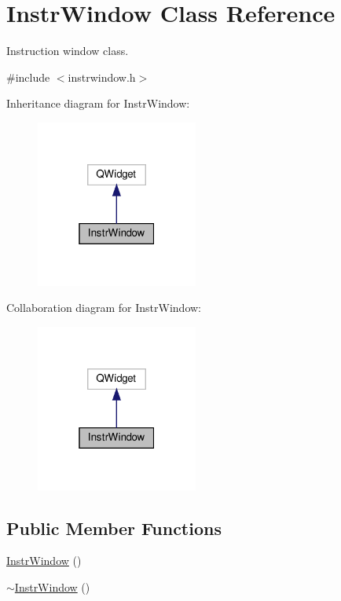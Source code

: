 \hypertarget{classInstrWindow}{}\section{Instr\+Window Class Reference}
\label{classInstrWindow}


Instruction window class.  




{\ttfamily \#include $<$instrwindow.\+h$>$}



Inheritance diagram for Instr\+Window\+:
\nopagebreak
\begin{figure}[H]
\begin{center}
\leavevmode
\includegraphics[width=151pt]{classInstrWindow__inherit__graph}
\end{center}
\end{figure}


Collaboration diagram for Instr\+Window\+:
\nopagebreak
\begin{figure}[H]
\begin{center}
\leavevmode
\includegraphics[width=151pt]{classInstrWindow__coll__graph}
\end{center}
\end{figure}
\subsection*{Public Member Functions}
\begin{DoxyCompactItemize}
\item 
\hyperlink{classInstrWindow_a4d425c2334a77bdc9e3f0aa91e691909}{Instr\+Window} ()
\item 
\hyperlink{classInstrWindow_a192ae02056142b9567d9c87c0708f7a5}{$\sim$\+Instr\+Window} ()
\end{DoxyCompactItemize}


